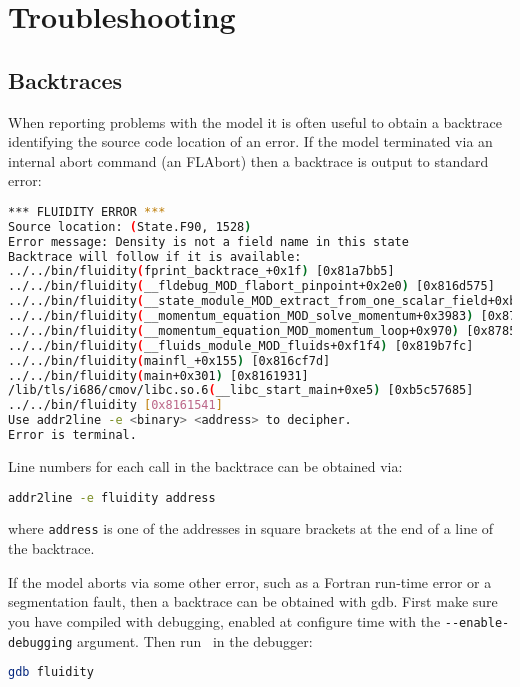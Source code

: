 \chapter{Troubleshooting}

\section{Backtraces}

When reporting problems with the model it is often useful to obtain a backtrace
identifying the source code location of an error. If the model terminated via
an internal abort command (an FLAbort) then a backtrace is output to standard
error:

\begin{lstlisting}[language = Bash]
*** FLUIDITY ERROR ***
Source location: (State.F90, 1528)
Error message: Density is not a field name in this state
Backtrace will follow if it is available:
../../bin/fluidity(fprint_backtrace_+0x1f) [0x81a7bb5]
../../bin/fluidity(__fldebug_MOD_flabort_pinpoint+0x2e0) [0x816d575]
../../bin/fluidity(__state_module_MOD_extract_from_one_scalar_field+0xb23) [0x822448f]
../../bin/fluidity(__momentum_equation_MOD_solve_momentum+0x3983) [0x8779c1c]
../../bin/fluidity(__momentum_equation_MOD_momentum_loop+0x970) [0x8785bdc]
../../bin/fluidity(__fluids_module_MOD_fluids+0xf1f4) [0x819b7fc]
../../bin/fluidity(mainfl_+0x155) [0x816cf7d]
../../bin/fluidity(main+0x301) [0x8161931]
/lib/tls/i686/cmov/libc.so.6(__libc_start_main+0xe5) [0xb5c57685]
../../bin/fluidity [0x8161541]
Use addr2line -e <binary> <address> to decipher.
Error is terminal.
\end{lstlisting}

Line numbers for each call in the backtrace can be obtained via:

\begin{lstlisting}[language = Bash]
addr2line -e fluidity address
\end{lstlisting}

where \lstinline[language = Bash]*address* is one of the addresses in square
brackets at the end of a line of the backtrace.

If the model aborts via some other error, such as a Fortran run-time error or
a segmentation fault, then a backtrace can be obtained with gdb. First make
sure you have compiled with debugging, enabled at configure time with the
\lstinline[language = Bash]*--enable-debugging* argument. Then run
\fluidity\ in the debugger:

\begin{lstlisting}[language = Bash]
gdb fluidity
\end{lstlisting}

